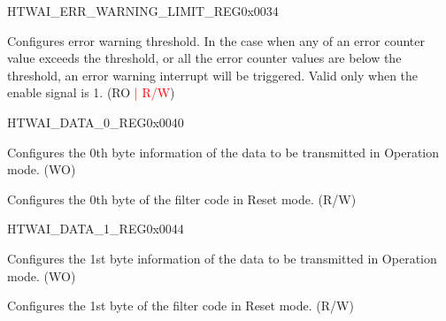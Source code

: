 \begin{register}{H}{TWAI\_ERR\_WARNING\_LIMIT\_REG}{0x0034}\label{regdesc:TWAIERRWARNINGLIMITREG}
%
%
\regnewline%
\begin{regdesc}\begin{reglist}
\label{fielddesc:TWAIERRWARNINGLIMIT}\item [TWAI\_ERR\_WARNING\_LIMIT] Configures error warning threshold. In the case when any of an error counter value exceeds the threshold, or all the error counter values are below the threshold, an error warning interrupt will be triggered. Valid only when the enable signal is 1. (RO \textcolor{red}{| R/W})
\end{reglist}\end{regdesc}
\end{register}


\begin{register}{H}{TWAI\_DATA\_0\_REG}{0x0040}\label{regdesc:TWAIDATA0REG}
%
%
\regnewline%
\begin{regdesc}\begin{reglist}
\label{fielddesc:TWAITXBYTE0}\item [TWAI\_TX\_BYTE\_0] Configures the 0th byte information of the data to be transmitted in Operation mode. (WO)
\label{fielddesc:TWAIACCEPTANCECODE0}\item [\textcolor{red}{TWAI\_ACCEPTANCE\_CODE\_0}] Configures the 0th byte of the filter code in Reset mode. (R/W)
\end{reglist}\end{regdesc}
\end{register}


\begin{register}{H}{TWAI\_DATA\_1\_REG}{0x0044}\label{regdesc:TWAIDATA1REG}
%
%
\regnewline%
\begin{regdesc}\begin{reglist}
\label{fielddesc:TWAITXBYTE1}\item [TWAI\_TX\_BYTE\_1] Configures the 1st byte information of the data to be transmitted in Operation mode. (WO)
\label{fielddesc:TWAIACCEPTANCECODE1}\item [\textcolor{red}{TWAI\_ACCEPTANCE\_CODE\_1}] Configures the 1st byte of the filter code in Reset mode. (R/W)
\end{reglist}\end{regdesc}
\end{register}


